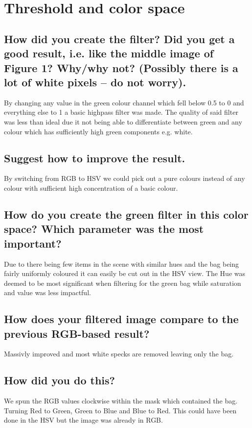 \section{Threshold and color space}
\subsection{How did you create the filter? Did you get a good result, i.e. like the middle image of Figure 1? Why/why not? (Possibly there is a lot of white pixels – do not worry).}
By changing any value in the green colour channel which fell below 0.5 to 0 and everything else to 1 a basic highpass filter was made. The quality of said filter was less than ideal due it not being able to differentiate between green and any colour which has sufficiently high green components e.g. white.

\subsection{Suggest how to improve the result.}
By switching from RGB to HSV we could pick out a pure colours instead of any colour with sufficient high concentration of a basic colour.
\subsection{How do you create the green filter in this color space? Which parameter was the most important?}
Due to there being few items in the scene with similar hues and the bag being fairly uniformly coloured it can easily be cut out in the HSV view. The Hue was deemed to be most significant when filtering for the green bag while saturation and value was less impactful.
\subsection{How does your filtered image compare to the previous RGB-based result?}
Massivly improved and most white specks are removed leaving only the bag.
\subsection{How did you do this?}
We spun the RGB values clockwise within the mask which contained the bag. Turning Red to Green, Green to Blue and Blue to Red. This could have been done in the HSV but the image was already in RGB.
